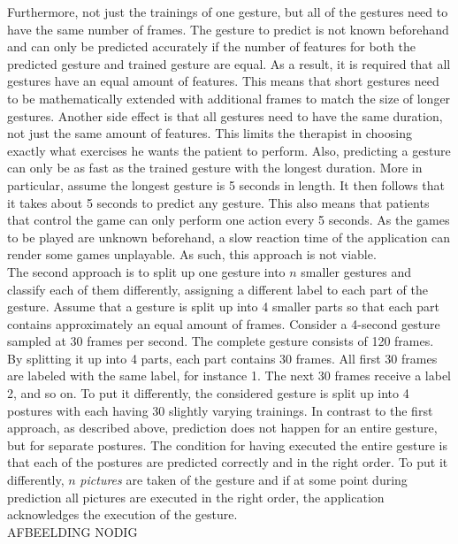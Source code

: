 Furthermore, not just the trainings of one gesture, but all of the gestures need to have the same number of frames. The gesture to predict is not known beforehand and can only be predicted accurately if the number of features for both the predicted gesture and trained gesture are equal. As a result, it is required that all gestures have an equal amount of features. This means that short gestures need to be mathematically extended with additional frames to match the size of longer gestures. Another side effect is that all gestures need to have the same duration, not just the same amount of features. This limits the therapist in choosing exactly what exercises he wants the patient to perform. Also, predicting a gesture can only be as fast as the trained gesture with the longest duration. More in particular, assume the longest gesture is 5 seconds in length. It then follows that it takes about 5 seconds to predict any gesture. This also means that patients that control the game can only perform one action every 5 seconds. As the games to be played are unknown beforehand, a slow reaction time of the application can render some games unplayable. As such, this approach is not viable.\\

The second approach is to split up one gesture into $n$ smaller gestures and classify each of them differently, assigning a different label to each part of the gesture. Assume that a gesture is split up into 4 smaller parts so that each part contains approximately an equal amount of frames. Consider a 4-second gesture sampled at 30 frames per second. The complete gesture consists of 120 frames. By splitting it up into 4 parts, each part contains 30 frames. All first 30 frames are labeled with the same label, for instance 1. The next 30 frames receive a label 2, and so on. To put it differently, the considered gesture is split up into 4 postures with each having 30 slightly varying trainings. In contrast to the first approach, as described above, prediction does not happen for an entire gesture, but for separate postures. The condition for having executed the entire gesture is that each of the postures are predicted correctly and in the right order. To put it differently, $n$ \emph{pictures} are taken of the gesture and if at some point during prediction all pictures are executed in the right order, the application acknowledges the execution of the gesture.\\

AFBEELDING NODIG\\

